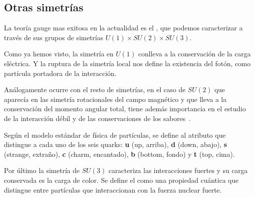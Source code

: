 \subsection{Otras simetrías}\label{subsec:otras-simetrías}
La teoría gauge mas exitosa en la actualidad es el , que podemos caracterizar a través de sus grupos de simetrías $U(1)\times SU(2)\times SU(3)$.

Como ya hemos visto, la simetría en $U(1)$ conlleva a la conservación de la carga eléctrica. Y la ruptura de la simetría local nos define la existencia del fotón, como partícula portadora de la interacción.

Análogamente ocurre con el resto de simetrías, en el caso de $SU(2)$ que aparecía en las simetría rotacionales del campo magnético y que lleva a la conservación del momento angular total, tiene además importancia en el estudio de la interacción débil y de las conservaciones de los sabores~\autocite[107]{ISMPP}.

Según el modelo estándar de física de partículas, se define  al atributo que distingue a cada uno de los seis quarks: \textbf{u} (up, arriba), \textbf{d} (down, abajo), \textbf{s} (strange, extraño), \textbf{c} (charm, encantado), \textbf{b} (bottom, fondo) y \textbf{t} (top, cima).

Por último la simetría de $SU(3)$ caracteriza las interacciones fuertes y su carga conservada es la carga de color. Se define el  como una propiedad cuántica que distingue entre partículas que interaccionan con la fuerza nuclear fuerte.

